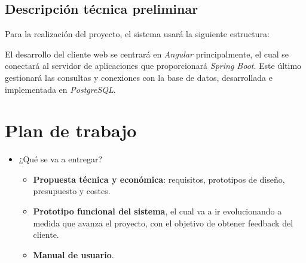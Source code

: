 \documentclass{article}
\begin{document}
\subsection{Descripción técnica preliminar}
Para la realización del proyecto, el sistema usará la siguiente estructura: \vspace{0.15cm}

\begin{figure}[H]
\end{figure}
\vspace{0.15cm}

El desarrollo del cliente web se centrará en \textit{Angular} principalmente, el cual se conectará al servidor de aplicaciones que proporcionará \textit{Spring Boot}. Este último gestionará las consultas y conexiones con la base de datos, desarrollada e implementada en \textit{PostgreSQL}.
\newpage

\section{Plan de trabajo}
\begin{itemize}
	\item ¿Qué se va a entregar?
	\begin{itemize}
		\item \textbf{Propuesta técnica y económica}: requisitos, prototipos de diseño, presupuesto y costes.
		\item \textbf{Prototipo funcional del sistema}, el cual va a ir evolucionando a medida que avanza el proyecto, con el objetivo de obtener feedback del cliente.
		\item \textbf{Manual de usuario}.
	\end{itemize}
\end{itemize}
\end{document}
